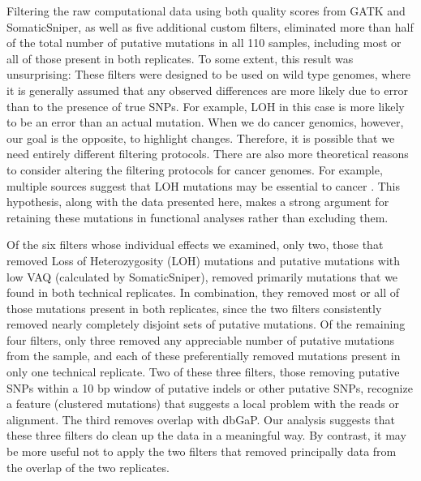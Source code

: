 \documentclass[11pt]{article} %
\begin{document}
{Filtering the raw computational data using both quality scores from GATK and SomaticSniper, as well as five additional custom filters, eliminated more than half of the total number of putative mutations in all 110 samples, including most or all of those present in both replicates. To some extent, this result was unsurprising: These filters were designed to be used on wild type genomes, where it is generally assumed that any observed differences are more likely due to error than to the presence of true SNPs. For example, LOH in this case is more likely to be an error than an actual mutation. When we do cancer genomics, however, our goal is the opposite, to highlight changes. Therefore, it is possible that we need entirely different filtering protocols. There are also more theoretical reasons to consider altering the filtering protocols for cancer genomes. For example, multiple sources suggest that LOH mutations may be essential to cancer \citep{LOH}. This hypothesis, along with the data presented here, makes a strong argument for retaining these mutations in functional analyses rather than excluding them.

Of the six filters whose individual effects we examined, only two, those that removed Loss of Heterozygosity (LOH) mutations and putative mutations with low VAQ (calculated by SomaticSniper), removed primarily mutations that we found in both technical replicates. In combination, they removed most or all of those mutations present in both replicates, since the two filters consistently removed nearly completely disjoint sets of putative mutations. Of the remaining four filters, only three removed any appreciable number of putative mutations from the sample, and each of these preferentially removed mutations present in only one technical replicate. Two of these three filters, those removing putative SNPs within a 10 bp window of putative indels or other putative SNPs, recognize a feature (clustered mutations) that suggests a local problem with the reads or alignment. The third removes overlap with dbGaP.  Our analysis suggests that these three filters do clean up the data in a meaningful way. By contrast, it may be more useful not to apply the two filters that removed principally data from the overlap of the two replicates.

}
\end{document}
